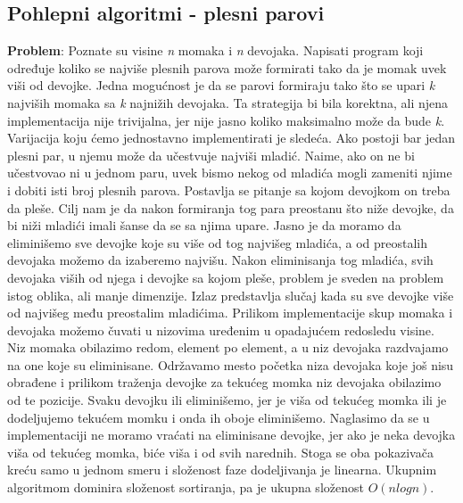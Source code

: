\documentclass{article}
\begin{document}
\subsection{Pohlepni algoritmi - plesni parovi}
\textbf{Problem}: Poznate su visine \textit{n} momaka i \textit{n} devojaka. Napisati program koji
određuje koliko se najviše plesnih parova može formirati tako da je momak uvek
viši od devojke.
\newline
Jedna mogućnost je da
se parovi formiraju tako što se upari \textit{k} najviših momaka sa \textit{k} najnižih devojaka.
Ta strategija bi bila korektna, ali njena implementacija nije trivijalna, jer nije
jasno koliko maksimalno može da bude \textit{k}. Varijacija koju ćemo jednostavno
implementirati je sledeća. Ako postoji bar jedan plesni par, u njemu može da
učestvuje najviši mladić. Naime, ako on ne bi učestvovao ni u jednom paru, uvek
bismo nekog od mladića mogli zameniti njime i dobiti isti broj plesnih parova. Postavlja se pitanje sa kojom devojkom on treba da pleše.
Cilj nam je da nakon formiranja tog para preostanu što niže devojke, da bi niži
mladići imali šanse da se sa njima upare. Jasno je da moramo da eliminišemo sve
devojke koje su više od tog najvišeg mladića,
a od preostalih devojaka možemo da izaberemo najvišu. Nakon eliminisanja
tog mladića, svih devojaka viših od njega i devojke sa kojom pleše, problem je
sveden na problem istog oblika, ali manje dimenzije. Izlaz predstavlja slučaj
kada su sve devojke više od najvišeg među preostalim mladićima.
\newline
Prilikom implementacije skup momaka i devojaka možemo čuvati u nizovima
uređenim u opadajućem redosledu visine. Niz momaka obilazimo redom, element
po element, a u niz devojaka razdvajamo na one koje su eliminisane.
Održavamo mesto početka niza devojaka koje još nisu obrađene i prilikom
traženja devojke za tekućeg momka niz devojaka obilazimo od te pozicije. Svaku
devojku ili eliminišemo, jer je viša od tekućeg momka ili je dodeljujemo tekućem
momku i onda ih oboje eliminišemo. Naglasimo da se u implementaciji ne moramo vraćati na eliminisane devojke, jer ako je neka devojka viša od tekućeg
momka, biće viša i od svih narednih. Stoga se oba pokazivača kreću samo u
jednom smeru i složenost faze dodeljivanja je linearna. Ukupnim algoritmom dominira složenost sortiranja, pa je ukupna složenost $O(nlogn)$.
\end{document}
